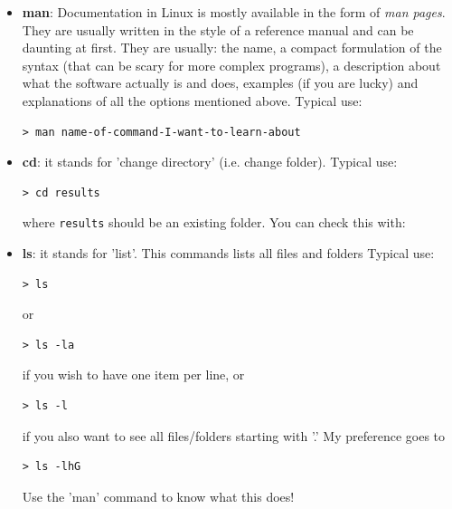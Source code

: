 \begin{itemize}
\item {\color{teal} \bf man}: 
Documentation in Linux is mostly available in the form of {\it man pages}.
They are usually written in the style of a reference manual and can be daunting at first.
They are usually:
the name, a compact formulation of the syntax (that can be scary for more complex programs),
a description about what the software actually is and does, 
examples (if you are lucky) and explanations of all the options mentioned above.
Typical use:
\begin{mdframed}[backgroundcolor=gray!10]
\begin{verbatim}
> man name-of-command-I-want-to-learn-about
\end{verbatim}
\end{mdframed}

\item {\color{teal} \bf cd}: it stands for 'change directory' (i.e. change folder). 
Typical use:
\begin{mdframed}[backgroundcolor=gray!10]
\begin{verbatim}
> cd results 
\end{verbatim}
\end{mdframed}
where {\tt results} should be an existing folder. You can check this with:

\item {\color{teal} \bf ls}: it stands for 'list'. This commands lists 
all files and folders 
Typical use:
\begin{mdframed}[backgroundcolor=gray!10]
\begin{verbatim}
> ls 
\end{verbatim}
\end{mdframed}
or 
\begin{mdframed}[backgroundcolor=gray!10]
\begin{verbatim}
> ls -la 
\end{verbatim}
\end{mdframed}
if you wish to have one item per line,
or 
\begin{mdframed}[backgroundcolor=gray!10]
\begin{verbatim}
> ls -l 
\end{verbatim}
\end{mdframed}
if you also want to see all files/folders starting with '.'
My preference goes to 
\begin{mdframed}[backgroundcolor=gray!10]
\begin{verbatim}
> ls -lhG 
\end{verbatim}
\end{mdframed}
Use the 'man' command to know what this does!


\end{itemize}
